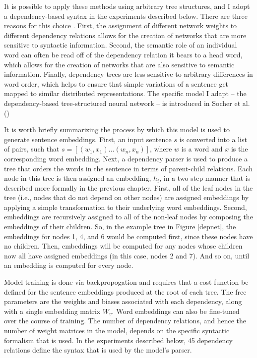 It is possible to apply these methods using arbitrary tree structures, and I adopt a dependency-based syntax in the experiments described below. There are three reasons for this choice \citep{Socher:2014}. First, the assignment of different network weights to different dependency relations allows for the creation of networks that are more sensitive to syntactic information. Second, the semantic role of an individual word can often be read off of the dependency relation it bears to a head word, which allows for the creation of networks that are also sensitive to semantic information. Finally, dependency trees are less sensitive to arbitrary differences in word order, which helps to ensure that simple variations of a sentence get mapped to similar distributed representations. The specific model I adapt -- the dependency-based tree-structured neural network -- is introduced in Socher et al. (\citeyear{Socher:2014})

It is worth briefly summarizing the process by which this model is used to generate sentence embeddings. First, an input sentence $s$ is converted into a list of pairs, such that $s = [(w_1, x_1)...(w_n, x_n)]$, where $w$ is a word and $x$ is the corresponding word embedding. Next, a dependency parser is used to produce a tree that orders the words in the sentence in terms of parent-child relations. Each node in this tree is then assigned an embedding, $h_i$, in a two-step manner that is described more formally in the previous chapter. First, all of the leaf nodes in the tree (i.e., nodes that do not depend on other nodes) are assigned embeddings by applying a simple transformation to their underlying word embeddings. Second, embeddings are recursively assigned to all of the non-leaf nodes by composing the embeddings of their children. So, in the example tree in Figure \ref{depnet}, the embeddings for nodes 1, 4, and 6 would be computed first, since these nodes have no children. Then, embeddings will be computed for any nodes whose children now all have assigned embeddings (in this case, nodes 2 and 7). And so on, until an embedding is computed for every node.

Model training is done via backpropogation and requires that a cost function be defined for the sentence embeddings produced at the root of each tree. The free parameters are the weights and biases associated with each dependency, along with a single embedding matrix $W_v$. Word embeddings can also be fine-tuned over the course of training. The number of dependency relations, and hence the number of weight matrices in the model, depends on the specific syntactic formalism that is used. In the experiments described below, 45 dependency relations define the syntax that is used by the model's parser.

